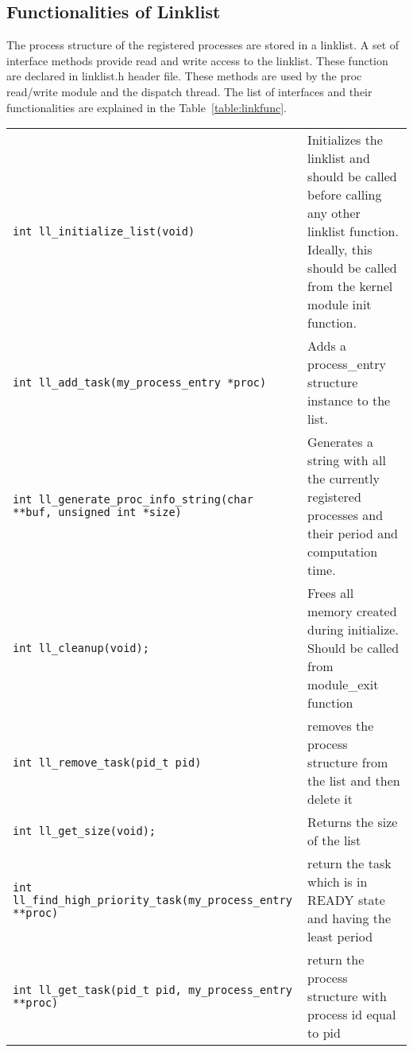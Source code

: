 \subsection{Functionalities of Linklist}\label{subsec:Link}

The process structure of the registered processes are stored in a linklist. A set of interface methods provide read and write access to the linklist. These function are declared in linklist.h header file. These methods are used by the proc read/write module and the dispatch thread. The list of interfaces and their functionalities are explained in the Table~\ref{table:linkfunc}. 

\begin{table*}[h]
  \centering
  \rcow
  \caption{List of functions to access the linklist\label{table:linkfunc}}
  \begin{tabular}{|p{7cm}|p{8cm}|}
    {\tt int ll\_initialize\_list(void)}  &  Initializes the linklist and should be called before calling any other linklist function. Ideally, this should be called from the kernel module init function.  \\
    {\tt int ll\_add\_task(my\_process\_entry *proc)}     &  Adds a process\_entry structure instance to the list.  \\
    {\tt int ll\_generate\_proc\_info\_string(char **buf, unsigned int *size)}&  Generates a string with all the currently registered processes and their period and computation time.\\
    {\tt int ll\_cleanup(void);}  & Frees all memory created during initialize. Should be called from module\_exit function  \\
    {\tt int ll\_remove\_task(pid\_t pid)}    & removes the process structure from the list and then delete it\\
    {\tt int ll\_get\_size(void);}    & Returns the size of the list \\
    {\tt int ll\_find\_high\_priority\_task(my\_process\_entry **proc)}    &  return the task which is in READY state and having the least period\\
    {\tt int ll\_get\_task(pid\_t pid, my\_process\_entry **proc)}  &  return the process structure with process id equal to pid\\
  \end{tabular}
\end{table*}

